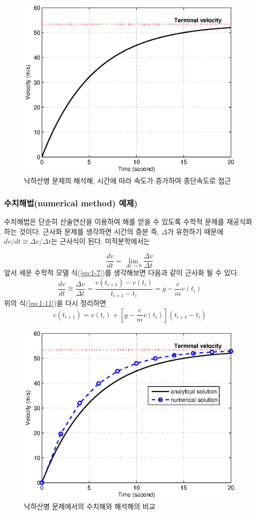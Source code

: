 \begin{figure}[!hbpt]
\centering
\includegraphics[keepaspectratio=true,width=0.4\linewidth]{figs/1-3.eps}
\caption{낙하산병 문제의 해석해, 시간에 따라 속도가 증가하여 종단속도로 접근}
\label{fig:1-3}
\end{figure}

\clearpage
\subsubsection{수치해법(numerical method) 예제)}

수치해법은 단순히 산술연산을 이용하여 해를 얻을 수 있도록 수학적 문제를 재공식화 하는 것이다. 근사화 문제를 생각하면 시간의 증분 즉, $\Delta$가 유한하기 때문에 $dv/dt \cong \Delta v/ \Delta t$는 근사식이 된다. 미적분학에서는

\begin{equation}
\frac{dv}{dt}=\lim_{\Delta t \rightarrow 0} \frac{\Delta v}{\Delta t}
\end{equation}
앞서 세운 수학적 모델 식(\ref{eq:1-7})를 생각해보면 다음과 같이 근사화 될 수 있다.
\begin{equation}
\frac{dv}{dt} \cong \frac{\Delta v}{\Delta t} = \frac{v\left(t_{i+1}\right)-v\left(t_{i}\right)}{t_{i+1}-t_{i}} = g-\frac{c}{m}v\left(t_{i}\right)
\label{eq:1-11}
\end{equation}
위의 식(\ref{eq:1-11})을 다시 정리하면
\begin{equation}
v\left(t_{i+1}\right)=v\left(t_{i}\right)+\left[g-\frac{c}{m}v\left(t_{i}\right)\right]\left(t_{i+1}-t_{i}\right)
\end{equation}

\begin{figure}[!hbpt]
\centering
\includegraphics[keepaspectratio=true,width=0.6\linewidth]{figs/1-5.eps}
\caption{낙하산병 문제에서의 수치해와 해석해의 비교}
\label{fig:1-5}
\end{figure}

